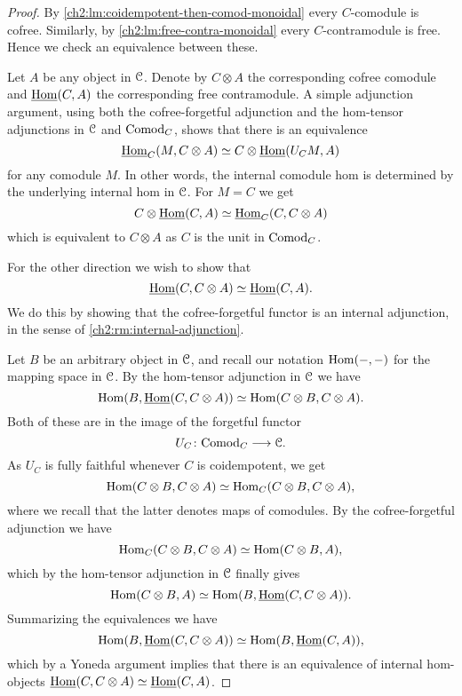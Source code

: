 \begin{proof}
    By \cref{ch2:lm:coidempotent-then-comod-monoidal} every $C$-comodule is cofree. Similarly, by \cref{ch2:lm:free-contra-monoidal} every $C$-contramodule is free. Hence we check an equivalence between these. 
    
    Let $A$ be any object in $\EuScript{C}$. Denote by $C\otimes A$ the corresponding cofree comodule and $\operatorname{\underline{Hom}}(C, A)$ the corresponding free contramodule. A simple adjunction argument, using both the cofree-forgetful adjunction and the hom-tensor adjunctions in $\EuScript{C}$ and $\mathrm{Comod}_C$, shows that there is an equivalence 
    \[\operatorname{\underline{Hom}}_C(M, C\otimes A)\simeq C\otimes \operatorname{\underline{Hom}}(U_C M, A)\]
    for any comodule $M$. In other words, the internal comodule hom is determined by the underlying internal hom in $\EuScript{C}$. For $M = C$ we get
    \[C\otimes \operatorname{\underline{Hom}}(C, A)\simeq \operatorname{\underline{Hom}}_C(C, C\otimes A)\]
    which is equivalent to $C\otimes A$ as $C$ is the unit in $\mathrm{Comod}_C$. 

    For the other direction we wish to show that 
    \[\operatorname{\underline{Hom}}(C, C\otimes A) \simeq \operatorname{\underline{Hom}}(C, A).\] 
    We do this by showing that the cofree-forgetful functor is an internal adjunction, in the sense of \cref{ch2:rm:internal-adjunction}. 

    Let $B$ be an arbitrary object in $\EuScript{C}$, and recall our notation $\operatorname{Hom}(-,-)$ for the mapping space in $\EuScript{C}$. By the hom-tensor adjunction in $\EuScript{C}$ we have 
    \[\operatorname{Hom}(B, \operatorname{\underline{Hom}}(C, C\otimes A)) \simeq \operatorname{Hom}(C\otimes B, C\otimes A).\]
    Both of these are in the image of the forgetful functor 
    \[U_C\colon\mathrm{Comod}_C\longrightarrow \EuScript{C}.\] 
    As $U_C$ is fully faithful whenever $C$ is coidempotent, we get 
    \[\operatorname{Hom}(C\otimes B, C\otimes A) \simeq \operatorname{Hom}_C(C\otimes B, C\otimes A),\]
    where we recall that the latter denotes maps of comodules. By the cofree-forgetful adjunction we have 
    \[\operatorname{Hom}_C(C\otimes B, C\otimes A) \simeq \operatorname{Hom}(C\otimes B, A),\]
    which by the hom-tensor adjunction in $\EuScript{C}$ finally gives 
    \[\operatorname{Hom}(C\otimes B, A) \simeq \operatorname{Hom}(B, \operatorname{\underline{Hom}}(C, C\otimes A)).\]
    Summarizing the equivalences we have 
    \[\operatorname{Hom}(B, \operatorname{\underline{Hom}}(C, C\otimes A))\simeq \operatorname{Hom}(B, \operatorname{\underline{Hom}}(C, A)),\] 
    which by a Yoneda argument implies that there is an equivalence of internal hom-objects $\operatorname{\underline{Hom}}(C, C\otimes A)\simeq \operatorname{\underline{Hom}}(C, A)$. 



\end{proof}
